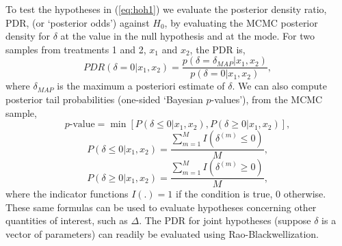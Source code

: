 \documentclass{juliacon}
\begin{document}
\vskip 6pt
To test the hypotheses in (\ref{eq:hoh1}) we evaluate the posterior density ratio, PDR, (or `posterior odds') against $H_0$, by evaluating the MCMC posterior density for $\delta$ at the value in the null hypothesis and at the mode.  For two samples from treatments 1 and 2, $x_1$ and $x_2$, the PDR is,
\begin{equation}
PDR(\delta = 0|x_1, x_2) = \frac{p(\delta=\delta_{MAP}|x_1,x_2)}{p(\delta=0|x_1,x_2)},
\label{eq:odds}
\end{equation}
where $\delta_{MAP}$ is the maximum a posteriori estimate of $\delta$.
We can also compute posterior tail probabilities (one-sided `Bayesian $p$-values'), from the MCMC sample,
\begin{equation}
p\text{-value} = \min{\left[P(\delta \le 0|x_1, x_2),P(\delta \ge 0|x_1, x_2)\right]},
\label{eq:pval}
\end{equation} 
$$P(\delta \le 0|x_1, x_2) =  \frac{\sum_{m=1}^M I(\delta^{(m)} \le 0) }  {M},$$
$$P(\delta \ge 0|x_1, x_2) =  \frac{\sum_{m=1}^M I(\delta^{(m)} \ge 0) }  {M},$$
where the indicator functions $I(.) = 1$ if the condition is true, $0$ otherwise. These same formulas can be used to evaluate hypotheses concerning other quantities of interest, such as $\Delta$. The PDR for joint hypotheses (suppose $\delta$ is a vector of parameters) can readily be evaluated using Rao-Blackwellization.\cite{Mills2018,Mills2019}
\end{document}
